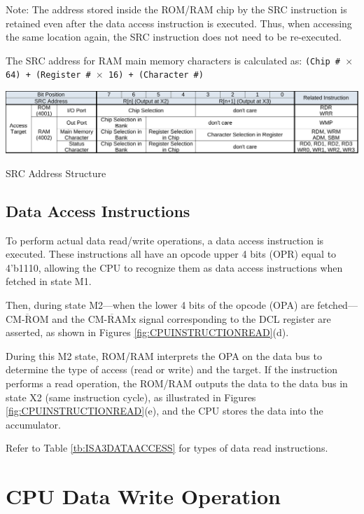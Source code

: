 Note: The address stored inside the ROM/RAM chip by the SRC instruction is retained even after the data access instruction is executed. Thus, when accessing the same location again, the SRC instruction does not need to be re-executed.

The SRC address for RAM main memory characters is calculated as:  
\texttt{(Chip \# $\times$ 64) + (Register \# $\times$ 16) + (Character \#)}

\begin{table}[htbp]
    \includegraphics[width=1.00\columnwidth]{./Table/SRCAddressStructure.pdf}
    \caption{SRC Address Structure}
    \label{tb:SRCADDRESSSTRUCTURE}
\end{table}

\subsection{Data Access Instructions}
To perform actual data read/write operations, a data access instruction is executed. These instructions all have an opcode upper 4 bits (OPR) equal to 4'b1110, allowing the CPU to recognize them as data access instructions when fetched in state M1.

Then, during state M2—when the lower 4 bits of the opcode (OPA) are fetched—$\overline{\text{CM-ROM}}$ and the $\overline{\text{CM-RAMx}}$ signal corresponding to the DCL register are asserted, as shown in Figures \ref{fig:CPUINSTRUCTIONREAD}(d).

During this M2 state, ROM/RAM interprets the OPA on the data bus to determine the type of access (read or write) and the target.  
If the instruction performs a read operation, the ROM/RAM outputs the data to the data bus in state X2 (same instruction cycle), as illustrated in Figures \ref{fig:CPUINSTRUCTIONREAD}(e), and the CPU stores the data into the accumulator.

Refer to Table \ref{tb:ISA3DATAACCESS} for types of data read instructions.

\section{CPU Data Write Operation}

